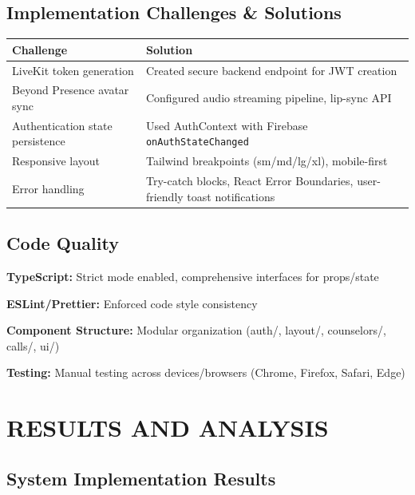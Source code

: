 \documentclass[11pt,a4paper]{report}
\begin{document}
\section{Implementation Challenges \& Solutions}

\begin{longtable}{p{5cm}p{8cm}}
\toprule
\textbf{Challenge} & \textbf{Solution} \\
\midrule
LiveKit token generation & Created secure backend endpoint for JWT creation \\
Beyond Presence avatar sync & Configured audio streaming pipeline, lip-sync API \\
Authentication state persistence & Used AuthContext with Firebase \texttt{onAuthStateChanged} \\
Responsive layout & Tailwind breakpoints (sm/md/lg/xl), mobile-first \\
Error handling & Try-catch blocks, React Error Boundaries, user-friendly toast notifications \\
\bottomrule
\end{longtable}

\section{Code Quality}
\textbf{TypeScript:} Strict mode enabled, comprehensive interfaces for props/state

\textbf{ESLint/Prettier:} Enforced code style consistency

\textbf{Component Structure:} Modular organization (auth/, layout/, counselors/, calls/, ui/)

\textbf{Testing:} Manual testing across devices/browsers (Chrome, Firefox, Safari, Edge)

\chapter{RESULTS AND ANALYSIS}

\section{System Implementation Results}
\end{document}
